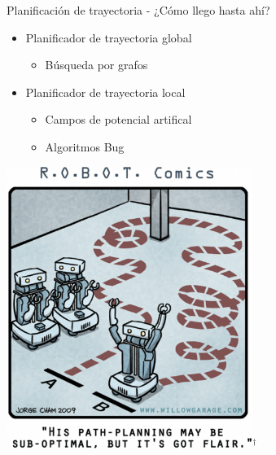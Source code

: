 \documentclass[
  24pt, %
  aspectratio=169, %
]{beamer}
\begin{document}
\begin{frame}{Planificación de trayectoria - ¿Cómo llego hasta ahí?}
  \begin{minipage}{0.47\textwidth}
    
    \begin{itemize}
    \item Planificador de trayectoria global
      \begin{itemize}
      \item Búsqueda por grafos
      \end{itemize}
      \bigskip %
    \item Planificador de trayectoria local
      \begin{itemize}
      \item Campos de potencial artifical
      \item Algoritmos Bug
      \end{itemize}
    \end{itemize}
  \end{minipage}
  \hspace{0.2cm}
  \begin{minipage}{0.5\textwidth}
    \includegraphics[width=0.6\textwidth]{img5}$^\dag$\\
  \end{minipage}
\end{frame}

  
\end{document}
